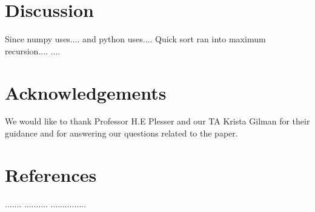 \documentclass[sigconf, nonacm, natbib, screen, balance=False]{acmart}
\begin{document}
\section{Discussion}\label{sec:discussion}
Since numpy uses.... and python uses....
Quick sort ran into maximum recursion....
....




\section{Acknowledgements}\label{sec:acknowledgements}
We would like to thank Professor H.E Plesser and our TA Krista Gilman for their guidance and for answering our
questions related to the paper.

\section{References}\label{sec:references}
.......
..........
...............



\end{document}
